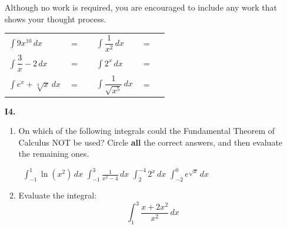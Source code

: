 \documentclass[11pt]{article}
\begin{document}
\begin{enumerate}
Although no work is required, you are encouraged to include any work that shows your thought process. 


\begin{center}
        \begin{tabular}{l c r l c r}
            $\displaystyle\int 9x^{10}\,dx$ & $=$ & \rule[-8pt]{1.5in}{0.4pt} &
            $\displaystyle\int \dfrac{1}{x^2} \,dx$ & $=$ & \rule[-8pt]{1.5in}{0.4pt}\\[1in]
            $\displaystyle\int \dfrac{3}{x}-2\,dx$ & $=$ & \rule[-8pt]{1.5in}{0.4pt}&
            $\displaystyle\int 2^x\,dx$ & $=$ & \rule[-8pt]{1.5in}{0.4pt}\\[1in]
            $\displaystyle\int e^x+\sqrt[3]{x} \,dx$ & $=$ & \rule[-8pt]{1.5in}{0.4pt} & 
            $\displaystyle\int \dfrac{1}{\sqrt{x^5}} \,dx$ & $=$ & \rule[-8pt]{1.5in}{0.4pt}\\[0.3in]
        \end{tabular}
\end{center}


\newpage


\item[\textbf{I4.}]
\begin{enumerate}

            \item On which of the following integrals could the Fundamental Theorem of Calculus NOT be used? Circle \textbf{all} the correct answers, and then evaluate the remaining ones.

    \,\hfill
     $\displaystyle\int_{-1}^1 \ln (x^2)\,dx$
    \hfill
     $\displaystyle\int_{-1}^3 \frac1{x^2-4}\,dx$
    \hfill
     $\displaystyle\int_{2}^{-4} 2^x\,dx$
    \hfill
     $\displaystyle\int_{-2}^{0} e^{\sqrt{x}}\,dx$
    \hfill\

    \vspace{5cm}

\item Evaluate the integral:
    \[
        \int_{1}^3 \frac{x+2x^2}{x^2}\,dx
    \]
        \end{enumerate}
        \pagebreak

\end{enumerate}
\end{document}
